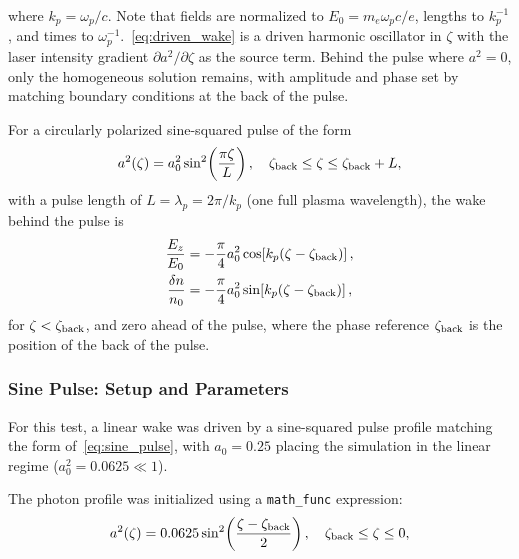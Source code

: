     where $k_p = \omega_p/c$. Note that fields are normalized to $E_0 = m_e\omega_p c/e$,
    lengths to $k_p^{-1}$, and times to $\omega_p^{-1}$.~\eqref{eq:driven_wake} is a driven harmonic oscillator in $\zeta$ with the laser intensity gradient 
    $\partial a^2/\partial\zeta$ as the source term. Behind the pulse 
    where $a^2 = 0$, only the homogeneous solution remains, with 
    amplitude and phase set by matching boundary conditions at the back of the 
    pulse.
    \vspace{1em}

    For a circularly polarized sine-squared pulse of the form
    \begin{equation}
        a^2(\zeta) = a_0^2\sin^2\!\left(\frac{\pi\zeta}{L}\right), 
        \quad \zeta_{\rm back} \leq \zeta \leq \zeta_{\rm back} + L,
        \label{eq:sine_pulse}
    \end{equation}
    with a pulse length of $L = \lambda_p = 2\pi/k_p$ (one full plasma 
    wavelength), the wake behind the pulse is
    \begin{align}
        \frac{E_z}{E_0} &= -\frac{\pi}{4}a_0^2\cos\!\left[k_p
        (\zeta - \zeta_{\rm back})\right], 
        \label{eq:Ez_linear} \\
        \frac{\delta n}{n_0} &= -\frac{\pi}{4}a_0^2\sin\!\left[k_p
        (\zeta - \zeta_{\rm back})\right],
        \label{eq:dn_linear}
    \end{align}
    for $\zeta < \zeta_{\rm back}$, and zero ahead of the pulse, where the 
    phase reference $\zeta_{\rm back}$ is the position of the 
    back of the pulse.


    \subsubsection{Sine Pulse: Setup and Parameters}
   
    For this test, a linear wake was driven by a sine-squared pulse
    profile matching the form of~\eqref{eq:sine_pulse}, with 
    $a_0 = 0.25$ placing the simulation in the linear regime 
    ($a_0^2 = 0.0625 \ll 1$).
    \vspace{1em}

    The photon profile was initialized using a \texttt{math\_func} expression:
    \begin{equation*}
        a^2(\zeta) = 0.0625\sin^2\!\left(\frac{\zeta - \zeta_{\rm back}}{2}\right),
        \quad \zeta_{\rm back} \leq \zeta \leq 0,
    \end{equation*}

